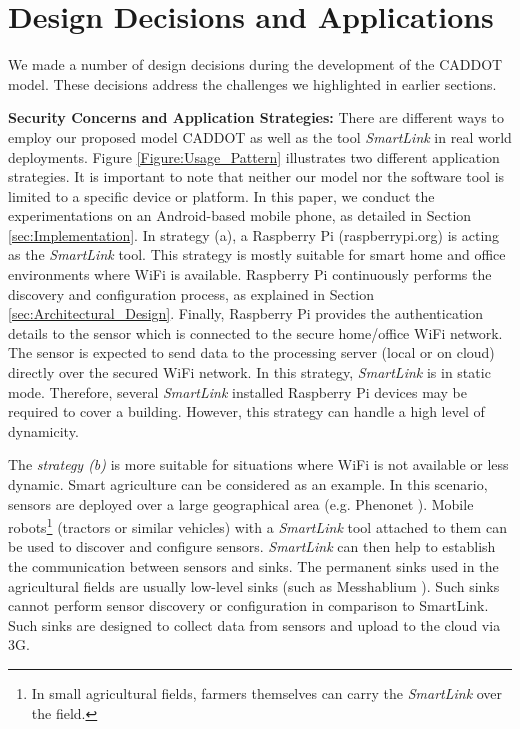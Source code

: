 \documentclass[graybox]{svmult}
\begin{document}
\section{Design Decisions and Applications}
\label{sec:Design_Decisions}

We made a number of design decisions during the development of the CADDOT model. These decisions address the challenges we highlighted in earlier sections.




\textbf{Security Concerns and Application Strategies:} There are different ways to employ our proposed model CADDOT as well as the tool \textit{SmartLink} in real world deployments. Figure \ref{Figure:Usage_Pattern} illustrates two different application strategies. It is important to note that neither our model nor the software tool is limited to a specific device or platform. In this paper, we conduct the experimentations on an Android-based mobile phone, as detailed in Section  \ref{sec:Implementation}. In strategy (a), a Raspberry Pi (raspberrypi.org) is acting as the \textit{SmartLink}  tool. This strategy is mostly suitable for smart home and office environments where WiFi is available. Raspberry Pi continuously performs the discovery and configuration process, as explained in Section  \ref{sec:Architectural_Design}. Finally, Raspberry Pi provides the authentication details to the sensor which is connected to the secure home/office WiFi network. The sensor is expected to send data to the processing server (local or on cloud) directly over the secured WiFi network. In this strategy, \textit{SmartLink} is in static mode. Therefore, several \textit{SmartLink} installed Raspberry Pi devices may be required to cover a building.  However, this strategy can handle a high level of dynamicity.




The \textit{{strategy (b)} }is  more suitable for situations where WiFi is not available or less dynamic. Smart agriculture can be considered as an example. In this scenario, sensors are deployed over a large geographical area (e.g. Phenonet \cite{P412}). Mobile robots\footnote{In small agricultural fields, farmers themselves can carry the \textit{SmartLink} over the field.} (tractors or similar vehicles) with a \textit{SmartLink} tool attached to them can be used to discover and configure sensors. \textit{SmartLink} can then help to establish the communication between sensors and sinks. The permanent sinks used in the agricultural fields are usually low-level sinks (such as Messhablium \cite{P595}). Such sinks cannot perform sensor discovery or configuration in comparison to SmartLink. Such sinks are designed to collect data from sensors and upload to the cloud via 3G.
\end{document}
